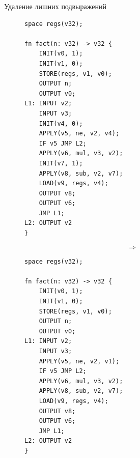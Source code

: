 \documentclass[presentation]{beamer}
\begin{document}
\begin{frame}[label={sec:org931c68d},fragile]{Удаление лишних подвыражений}
 \begin{figure}
\begin{minipage}[t]{0.4\textwidth}
\begin{verbatim}
space regs(v32);

fn fact(n: v32) -> v32 {
    INIT(v0, 1);
    INIT(v1, 0);
    STORE(regs, v1, v0);
    OUTPUT n;
    OUTPUT v0;
L1: INPUT v2;
    INPUT v3;
    INIT(v4, 0);
    APPLY(v5, ne, v2, v4);
    IF v5 JMP L2;
    APPLY(v6, mul, v3, v2);
    INIT(v7, 1);
    APPLY(v8, sub, v2, v7);
    LOAD(v9, regs, v4);
    OUTPUT v8;
    OUTPUT v6;
    JMP L1;
L2: OUTPUT v2
}
\end{verbatim}
\end{minipage}%
\begin{minipage}[t]{0.2\textwidth}
$$\Longrightarrow$$
\end{minipage}%
\begin{minipage}[t]{0.4\textwidth}
\begin{verbatim}
space regs(v32);

fn fact(n: v32) -> v32 {
    INIT(v0, 1);
    INIT(v1, 0);
    STORE(regs, v1, v0);
    OUTPUT n;
    OUTPUT v0;
L1: INPUT v2;
    INPUT v3;
    APPLY(v5, ne, v2, v1);
    IF v5 JMP L2;
    APPLY(v6, mul, v3, v2);
    APPLY(v8, sub, v2, v7);
    LOAD(v9, regs, v4);
    OUTPUT v8;
    OUTPUT v6;
    JMP L1;
L2: OUTPUT v2
}
\end{verbatim}
\end{minipage}%
\end{figure}
\end{frame}
\end{document}
